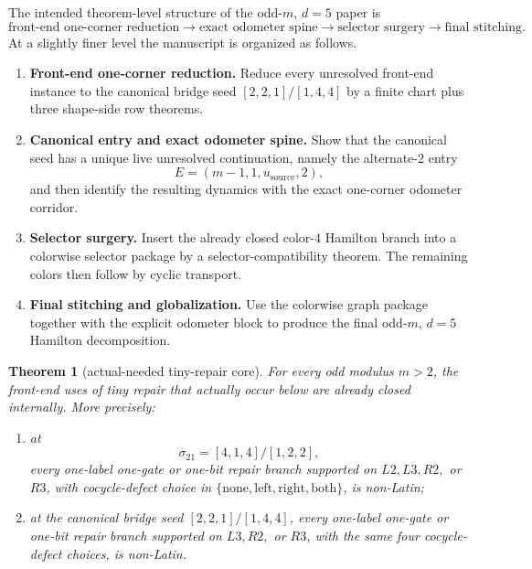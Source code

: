 \documentclass[11pt]{article}
\newtheorem{theorem}{Theorem}[section]
\newcommand{\sig}[2]{\sigma_{#1#2}}
\newcommand{\CanL}{[2,2,1]}
\newcommand{\CanR}{[1,4,4]}
\newcommand{\CanSeed}{\CanL/\CanR}
\begin{document}
The intended theorem-level structure of the odd-$m$, $d=5$ paper is
\[
\text{front-end one-corner reduction}
\to
\text{exact odometer spine}
\to
\text{selector surgery}
\to
\text{final stitching}.
\]
At a slightly finer level the manuscript is organized as follows.
\begin{enumerate}[label=\textup{(\Roman*)},leftmargin=3.0em]
\item \textbf{Front-end one-corner reduction.}
      Reduce every unresolved front-end instance to the canonical bridge seed
      \(\CanSeed\) by a finite chart plus three shape-side row theorems.
\item \textbf{Canonical entry and exact odometer spine.}
      Show that the canonical seed has a unique live unresolved continuation,
      namely the alternate-$2$ entry
      \[
      E=(m-1,1,u_{\mathrm{source}},2),
      \]
      and then identify the resulting dynamics with the exact one-corner
      odometer corridor.
\item \textbf{Selector surgery.}
      Insert the already closed color-$4$ Hamilton branch into a colorwise
      selector package by a selector-compatibility theorem.  The remaining
      colors then follow by cyclic transport.
\item \textbf{Final stitching and globalization.}
      Use the colorwise graph package together with the explicit odometer block
      to produce the final odd-$m$, $d=5$ Hamilton decomposition.
\end{enumerate}

\begin{theorem}[actual-needed tiny-repair core]
\label{thm:T0-needed}
For every odd modulus $m>2$, the front-end uses of tiny repair that actually
occur below are already closed internally.
More precisely:
\begin{enumerate}[label=\textup{(\arabic*)},leftmargin=2.8em]
\item at
      \[
      \sig21=[4,1,4]/[1,2,2],
      \]
      every one-label one-gate or one-bit repair branch supported on
      \(L2,L3,R2,\) or \(R3\), with cocycle-defect choice in
      \(\{\mathrm{none},\mathrm{left},\mathrm{right},\mathrm{both}\}\),
      is non-Latin;
\item at the canonical bridge seed \(\CanSeed\), every one-label one-gate or
      one-bit repair branch supported on \(L3,R2,\) or \(R3\), with the same
      four cocycle-defect choices, is non-Latin.
\end{enumerate}
\end{theorem}
\end{document}
